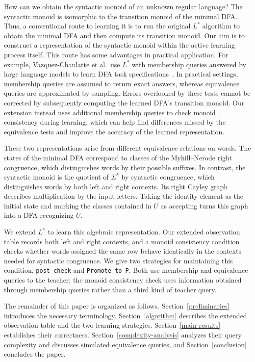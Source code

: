 \documentclass{ieice-tecrep}
\begin{document}
How can we obtain the syntactic monoid of an unknown regular language? 
The syntactic monoid is isomorphic to the transition monoid of the
minimal DFA. Thus, a conventional route to learning it is to run 
the original \(L^*\) algorithm to obtain the minimal DFA and then
compute its transition monoid. 
Our aim is to construct a 
representation of the syntactic monoid within the active learning
process itself. This route has some advantages in practical application. 
For example, Vazquez-Chanlatte et al.\ use \(L^*\) with membership
queries answered by large language models to learn DFA task
specifications~\cite{vazquezchanlatte2025lstarlm}. In practical settings,
membership queries are assumed to return exact answers, whereas
equivalence queries are approximated by sampling. Errors
overlooked by these tests cannot be corrected by subsequently
computing the learned DFA's transition monoid. Our extension instead
uses additional membership queries to check monoid consistency
during learning, which can help find differences missed by the
equivalence tests and improve the accuracy of the learned
representation.

These two representations arise from different equivalence relations
on words. The states of the minimal DFA correspond to classes of the
Myhill--Nerode right congruence, which distinguishes words by their
possible suffixes. In contrast, the syntactic monoid is the quotient
of \(\Sigma^*\) by syntactic congruence, which distinguishes words by
both left and right contexts. Its right Cayley graph describes
multiplication by the input letters. Taking the identity element as
the initial state and marking the classes contained in \(U\) as
accepting turns this graph into a DFA recognizing \(U\).

We extend \(L^*\) to learn this algebraic representation. Our
extended observation table records both left and right contexts, and
a monoid consistency condition checks whether words assigned the same
row behave identically in the contexts needed for syntactic
congruence. We give two strategies for maintaining this condition,
\texttt{post\_check} and \texttt{Promote\_to\_P}. Both use membership
and equivalence queries to the teacher; the monoid consistency check
uses information obtained through membership queries rather than a
third kind of teacher query.

The remainder of this paper is organized as follows.
Section~\ref{preliminaries} introduces the necessary terminology.
Section~\ref{algorithm} describes the extended observation table and
the two learning strategies. Section~\ref{main-results} establishes
their correctness. Section~\ref{complexity-analysis} analyzes their
query complexity and discusses simulated equivalence queries, and
Section~\ref{conclusion} concludes the paper.
\end{document}
